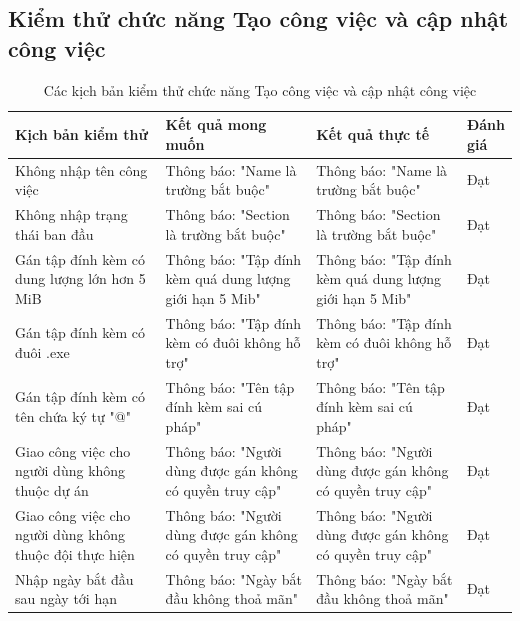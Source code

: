 \documentclass[../DoAn.tex]{subfiles}
\begin{document}
\newpage

\subsection{Kiểm thử chức năng Tạo công việc và cập nhật công việc}
\label{subsection:4.4.2}

\begin{table}[H]
    \renewcommand{\arraystretch}{1.2}
    \centering{}
    \begin{tabular}{p{0.3\linewidth}p{0.3\linewidth}p{0.3\linewidth}p{0.1\linewidth}}
        \hline
        \textbf{Kịch bản kiểm thử}                              & \textbf{Kết quả mong muốn}                               & \textbf{Kết quả thực tế}                                 & \textbf{Đánh giá} \\ \hline
        Không nhập tên công việc                                & Thông báo: "Name là trường bắt buộc"                     & Thông báo: "Name là trường bắt buộc"                     & Đạt               \\ \hline
        Không nhập trạng thái ban đầu                           & Thông báo: "Section là trường bắt buộc"                  & Thông báo: "Section là trường bắt buộc"                  & Đạt               \\ \hline
        Gán tập đính kèm có dung lượng lớn hơn 5 MiB            & Thông báo: "Tập đính kèm quá dung lượng giới hạn 5 Mib"  & Thông báo: "Tập đính kèm quá dung lượng giới hạn 5 Mib"  & Đạt               \\ \hline
        Gán tập đính kèm có đuôi .exe                           & Thông báo: "Tập đính kèm có đuôi không hỗ trợ"           & Thông báo: "Tập đính kèm có đuôi không hỗ trợ"           & Đạt               \\ \hline
        Gán tập đính kèm có tên chứa ký tự "@"                  & Thông báo: "Tên tập đính kèm sai cú pháp"                & Thông báo: "Tên tập đính kèm sai cú pháp"                & Đạt               \\ \hline
        Giao công việc cho người dùng không thuộc dự án         & Thông báo: "Người dùng được gán không có quyền truy cập" & Thông báo: "Người dùng được gán không có quyền truy cập" & Đạt               \\ \hline
        Giao công việc cho người dùng không thuộc đội thực hiện & Thông báo: "Người dùng được gán không có quyền truy cập" & Thông báo: "Người dùng được gán không có quyền truy cập" & Đạt               \\ \hline
        Nhập ngày bắt đầu sau ngày tới hạn                      & Thông báo: "Ngày bắt đầu không thoả mãn"                 & Thông báo: "Ngày bắt đầu không thoả mãn"                 & Đạt               \\ \hline
    \end{tabular}
    \renewcommand{\arraystretch}{1}
    \caption{Các kịch bản kiểm thử chức năng Tạo công việc và cập nhật công việc}
    \label{fig:testcase_task}
\end{table}
\end{document}
